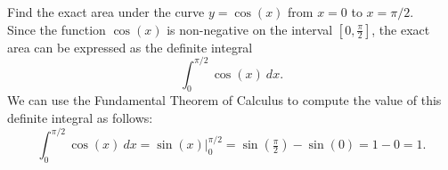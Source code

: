 \documentclass{ximera}
\begin{document}
\begin{example} %
Find the exact area under the curve $y = \cos(x)$ from $x=0$ to $x= \pi/2$.\\
Since the function $\cos(x)$ is non-negative on the interval $[0, \frac{\pi}{2}]$, the exact area can be expressed as the definite integral
\[\int_0^{\pi/2} \cos(x) \ dx.\]
We can use the Fundamental Theorem of Calculus to compute the value of this definite integral as follows:
\[\int_0^{\pi/2} \cos(x) \ dx = \sin(x) \Big|_0^{\pi/2} = \sin(\tfrac{\pi}{2}) - \sin(0)= 1- 0 = 1.\]


\begin{image}
\end{image}

\end{example}
\end{document}

